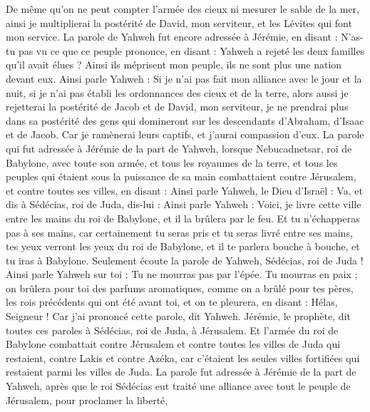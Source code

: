 \begin{multicols}{2}
De même qu’on ne peut compter l'armée des cieux ni mesurer le sable de la mer, ainsi je multiplierai la postérité de David, mon serviteur, et les Lévites qui font mon service.
La parole de Yahweh fut encore adressée à Jérémie, en disant :
N'as-tu pas vu ce que ce peuple prononce, en disant : Yahweh a rejeté les deux familles qu'il avait élues ? Ainsi ils méprisent mon peuple, ils ne sont plus une nation devant eux.
Ainsi parle Yahweh : Si je n'ai pas fait mon alliance avec le jour et la nuit, si je n'ai pas établi les ordonnances des cieux et de la terre,
alors aussi je rejetterai la postérité de Jacob et de David, mon serviteur, je ne prendrai plus dans sa postérité des gens qui domineront sur les descendants d'Abraham, d'Isaac et de Jacob. Car je ramènerai leurs captifs, et j'aurai compassion d'eux.
\VerseOne{}La parole qui fut adressée à Jérémie de la part de Yahweh, lorsque Nebucadnetsar, roi de Babylone, avec toute son armée, et tous les royaumes de la terre, et tous les peuples qui étaient sous la puissance de sa main combattaient contre Jérusalem, et contre toutes ses villes, en disant :
Ainsi parle Yahweh, le Dieu d'Israël : Va, et dis à Sédécias, roi de Juda, dis-lui : Ainsi parle Yahweh : Voici, je livre cette ville entre les mains du roi de Babylone, et il la brûlera par le feu.
Et tu n'échapperas pas à ses mains, car certainement tu seras pris et tu seras livré entre ses mains, tes yeux verront les yeux du roi de Babylone, et il te parlera bouche à bouche, et tu iras à Babylone.
Seulement écoute la parole de Yahweh, Sédécias, roi de Juda ! Ainsi parle Yahweh sur toi : Tu ne mourras pas par l'épée.
Tu mourras en paix ; on brûlera pour toi des parfums aromatiques, comme on a brûlé pour tes pères, les rois précédents qui ont été avant toi, et on te pleurera, en disant : Hélas, Seigneur ! Car j'ai prononcé cette parole, dit Yahweh.
Jérémie, le prophète, dit toutes ces paroles à Sédécias, roi de Juda, à Jérusalem.
Et l'armée du roi de Babylone combattait contre Jérusalem et contre toutes les villes de Juda qui restaient, contre Lakis et contre Azéka, car c'étaient les seules villes fortifiées qui restaient parmi les villes de Juda.
La parole fut adressée à Jérémie de la part de Yahweh, après que le roi Sédécias eut traité une alliance avec tout le peuple de Jérusalem, pour proclamer la liberté,

\end{multicols}
